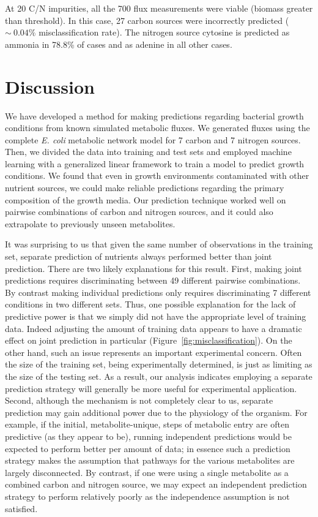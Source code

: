 \documentclass[12pt]{article}
\begin{document}
At 20 C/N impurities, all the 700 flux measurements were viable (biomass greater than threshold). In this case, 27 carbon sources were incorrectly predicted ($\sim~0.04\%$ misclassification rate). The nitrogen source cytosine is predicted as ammonia in 78.8\% of cases and as adenine in all other cases.

\section{Discussion}

We have developed a method for making predictions regarding bacterial growth conditions from known simulated metabolic fluxes. We generated fluxes using the complete \emph{E. coli} metabolic network model for 7 carbon and 7 nitrogen sources. Then, we divided the data into training and test sets and employed machine learning with a generalized linear framework to train a model to predict growth conditions. We found that even in growth environments contaminated with other nutrient sources, we could make reliable predictions regarding the primary composition of the growth media. Our prediction technique worked well on pairwise combinations of carbon and nitrogen sources, and it could also extrapolate to previously unseen metabolites.

It was surprising to us that given the same number of observations in the training set, separate prediction of nutrients always performed better than joint prediction. There are two likely explanations for this result. First, making joint predictions requires discriminating between 49 different pairwise combinations. By contrast making individual predictions only requires discriminating 7 different conditions in two different sets. Thus, one possible explanation for the lack of predictive power is that we simply did not have the appropriate level of training data. Indeed adjusting the amount of training data appears to have a dramatic effect on joint prediction in particular (Figure~\ref{fig:misclassification}). On the other hand, such an issue represents an important experimental concern. Often the size of the training set, being experimentally determined, is just as limiting as the size of the testing set. As a result, our analysis indicates employing a separate prediction strategy will generally be more useful for experimental application. Second, although the mechanism is not completely clear to us, separate prediction may gain additional power due to the physiology of the organism. For example, if the initial, metabolite-unique, steps of metabolic entry are often predictive (as they appear to be), running independent predictions would be expected to perform better per amount of data; in essence such a prediction strategy makes the assumption that pathways for the various metabolites are largely disconnected. By contrast, if one were using a single metabolite as a combined carbon and nitrogen source, we may expect an independent prediction strategy to perform relatively poorly as the independence assumption is not satisfied.
\end{document}

